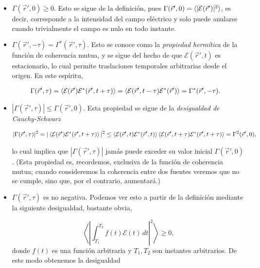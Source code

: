 	\begin{itemize}
		\item[a)] $\Gamma(\vec{r}',0) \geq 0$. Esto se sigue de la definición, pues $\Gamma(\vec{r}',0) = \braket{|\mathcal{E}(\vec{r}')|^2}$, es decir, corresponde a la intensidad del campo eléctrico y solo puede anularse cuando trivialmente el campo es nulo en todo instante.

		\item[b)] $\Gamma(\vec{r}',-\tau) = \Gamma^*(\vec{r}',\tau)$. Esto se conoce como la \textit{propiedad hermítica} de la función de coherencia mutua, y se sigue del hecho de que $\mathcal{E}(\vec{r}',t)$ es estacionario, lo cual permite traslaciones temporales arbitrarias desde el origen. En este espíritu,

		\begin{align}
			& \Gamma(\vec{r}',\tau) = \braket{\mathcal{E}(\vec{r}')\mathcal{E}^*(\vec{r}',t + \tau)} = \braket{\mathcal{E}(\vec{r}',t-\tau)\mathcal{E}^*(\vec{r}')} = \Gamma^*(\vec{r}',-\tau).
		\end{align}

		\item[c)] $|\Gamma(\vec{r}',\tau)| \leq \Gamma(\vec{r}',0)$. Esta propiedad se sigue de la \textit{desigualdad de Cauchy-Schwarz}

		\begin{equation}
			|\Gamma(\vec{r}',\tau)|^2 = | \braket{\mathcal{E}(\vec{r}')\mathcal{E}^*(\vec{r}',t+\tau)} |^2 \leq  \braket{\mathcal{E}(\vec{r}',t)\mathcal{E}^*(\vec{r}',t)} \braket{\mathcal{E}(\vec{r}',t+\tau)\mathcal{E}^*(\vec{r}',t+\tau)} = \Gamma^2(\vec{r}',0),
		\end{equation}

		lo cual implica que $|\Gamma(\vec{r}',\tau)|$ jamás puede exceder su valor inicial $\Gamma(\vec{r}',0)$. (Esta propiedad es, recordemos, exclusiva de la función de coherencia mutua; cuando consideremos la coherencia entre dos fuentes veremos que no se cumple, sino que, por el contrario, aumentará.)

		\item[d)] $\Gamma(\vec{r}',\tau)$ es no negativa. Podemos ver esto a partir de la definición mediante la siguiente desigualdad, bastante obvia,

		\begin{equation}
			\left\langle \left| \int_{T_1}^{T_2} f(t)\mathcal{E}(t)\,dt \right|^2\right\rangle \geq 0,
		\end{equation}
		donde $f(t)$ es una función arbitraria y $T_1,T_2$ son instantes arbitrarios. De este modo obtenemos la desigualdad


\end{itemize}

